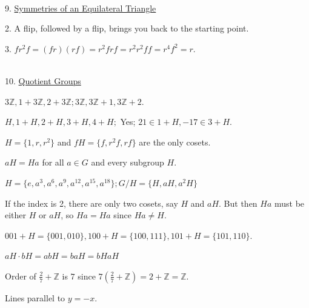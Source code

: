 \documentclass[12pt]{book}
\theoremstyle{definition}
\begin{document}
~\\[.1in]
{\Large 9. \underline{Symmetries of an Equilateral Triangle}}

\begin{oddenumerate}
	\item[2.] A flip, followed by a flip, brings you back to the starting point.
	
	\item[3.] $ fr^2f=(fr)(rf)=r^2frf=r^2r^2ff=r^4f^2=r. $
	
\end{oddenumerate}	

~\\[.1in]
{\Large 10. \underline{Quotient Groups}}

\begin{oddenumerate}
	\item $ 3\mathbb{Z}, 1+3\mathbb{Z}, 2+3\mathbb{Z} ; 3\mathbb{Z}, 3\mathbb{Z}+1, 3\mathbb{Z}+2. $
	
	\item $ H, 1+H, 2+H, 3+H, 4+H; $ Yes; $ 21\in 1+H, -17\in 3+H. $
	
	\item $ H=\{1,r,r^2\} $ and $ fH=\{f,r^2f,rf\} $ are the only cosets.
	
	\item $ aH=Ha $ for all $ a\in G $ and every subgroup $ H $.
	
	\item $ H=\{e,a^3,a^6,a^9,a^{12},a^{15},a^{18}\}; G/H=\{H,aH,a^2H\} $
	
	\item If the index is 2, there are only two cosets, say $ H $ and $ aH $. But then $ Ha $ must be either $ H $ or $ aH $, so $ Ha=Ha $ since $ Ha\neq H. $
	
	\item $ 001+H=\{001,010\}, 100+H=\{100,111\}, 101+H=\{101,110\}. $
	
	\item $ aH\cdot bH=abH=baH=bHaH $
	
	\item Order of $\frac{2}{7}+\mathbb{Z}$ is $ 7 $ since $ 7(\frac{2}{7}+\mathbb{Z})=2+\mathbb{Z}=\mathbb{Z} $.
	
	\item Lines parallel to $ y=-x. $
	
\end{oddenumerate}
\end{document}
